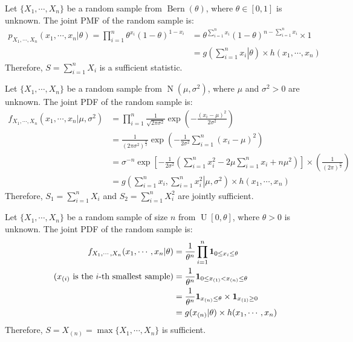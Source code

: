 \documentclass{huhtakm-template-book-v2}
\DeclareMathOperator{\Bern}{Bern}
\DeclareMathOperator{\N}{N}
\DeclareMathOperator{\U}{U}
\begin{document}
\begin{eg}
	\label{Chapter 1 (Example) Sufficient statistics of Bern(theta)}
	Let $\{X_{1},\cdots,X_{n}\}$ be a random sample from $\Bern(\theta)$, where $\theta\in[0,1]$ is unknown. The joint PMF of the random sample is:
	\begin{align*}
		p_{X_{1},\cdots,X_{n}}(x_{1},\cdots,x_{n}|\theta)=\prod_{i=1}^{n}\theta^{x_{i}}(1-\theta)^{1-x_{i}}&=\theta^{\sum_{i=1}^{n}x_{i}}(1-\theta)^{n-\sum_{i=1}^{n}x_{i}}\times 1\\
		&=g\left(\left.\sum_{i=1}^{n}x_{i}\right|\theta\right)\times h(x_{1},\cdots,x_{n})		
	\end{align*}
	Therefore, $S=\sum_{i=1}^{n}X_{i}$ is a sufficient statistic.
\end{eg}
\begin{eg}
	Let $\{X_{1},\cdots,X_{n}\}$ be a random sample from $\N(\mu,\sigma^{2})$, where $\mu$ and $\sigma^{2}>0$ are unknown. The joint PDF of the random sample is:
	\begin{align*}
		f_{X_{1},\cdots,X_{n}}(x_{1},\cdots,x_{n}|\mu,\sigma^{2})&=\prod_{i=1}^{n}\frac{1}{\sqrt{2\pi\sigma^{2}}}\exp\left(-\frac{(x_{i}-\mu)^{2}}{2\sigma^{2}}\right)\\
		&=\frac{1}{(2\pi\sigma^{2})^{\frac{n}{2}}}\exp\left(-\frac{1}{2\sigma^{2}}\sum_{i=1}^{n}(x_{i}-\mu)^{2}\right)\\
		&=\sigma^{-n}\exp\left[-\frac{1}{2\sigma^{2}}\left(\sum_{i=1}^{n}x_{i}^{2}-2\mu\sum_{i=1}^{n}x_{i}+n\mu^{2}\right)\right]\times\left(\frac{1}{(2\pi)^{
		\frac{n}{2}}}\right)\\
		&=g\left(\left.\sum_{i=1}^{n}x_{i},\sum_{i=1}^{n}x_{i}^{2}\right|\mu,\sigma^{2}\right)\times h(x_{1},\cdots,x_{n})
	\end{align*}
	Therefore, $S_{1}=\sum_{i=1}^{n}X_{i}$ and $S_{2}=\sum_{i=1}^{n}X_{i}^{2}$ are jointly sufficient.
\end{eg}
\begin{eg}
	\label{Chapter 3 (Example) Sufficient statistic for U[0,theta]}
	Let $\{X_{1},\cdots,X_{n}\}$ be a random sample of size $n$ from $\U[0,\theta]$, where $\theta>0$ is unknown. The joint PDF of the random sample is:
	\begin{align*}
		f_{X_{1},\cdots,X_{n}}(x_{1},\cdots,x_{n}|\theta)&=\frac{1}{\theta^{n}}\prod_{i=1}^{n}\mathbf{1}_{0\leq x_{i}\leq\theta}\\
		\tag{$x_{(i)}$ is the $i$-th smallest sample}
		&=\frac{1}{\theta^{n}}\mathbf{1}_{0\leq x_{(1)}<x_{(n)}\leq\theta}\\
		&=\frac{1}{\theta^{n}}\mathbf{1}_{x_{(n)}\leq\theta}\times\mathbf{1}_{x_{(1)}\geq 0}\\
		&=g(x_{(n)}|\theta)\times h(x_{1},\cdots,x_{n})
	\end{align*}
	Therefore, $S=X_{(n)}=\max\{X_{1},\cdots,X_{n}\}$ is sufficient.
\end{eg}
\end{document}
